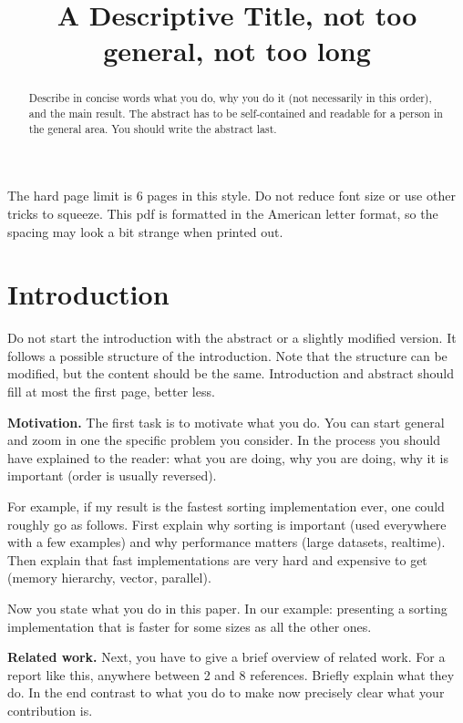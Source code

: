 \documentclass[letterpaper]{article}
\title{A Descriptive Title, not too general, not too long}
\newcommand{\mypar}[1]{{\bf #1.}}
\theoremstyle{definition}
\begin{document}
%
\maketitle
%

\clearpage
\iffalse

The hard page limit is 6 pages in this style. Do not reduce font size
or use other tricks to squeeze. This pdf is formatted in the American letter format, so the spacing may look a bit strange when printed out.

\begin{abstract}
Describe in concise words what you do, why you do it (not necessarily
in this order), and the main result.  The abstract has to be
self-contained and readable for a person in the general area. You
should write the abstract last.
\end{abstract}

\section{Introduction}\label{sec:intro}

Do not start the introduction with the abstract or a slightly modified
version. It follows a possible structure of the introduction. 
Note that the structure can be modified, but the
content should be the same. Introduction and abstract should fill at most the first page, better less.

\mypar{Motivation} The first task is to motivate what you do.  You can
start general and zoom in one the specific problem you consider.  In
the process you should have explained to the reader: what you are doing,
why you are doing, why it is important (order is usually reversed).

For example, if my result is the fastest sorting implementation ever, one
could roughly go as follows. First explain why sorting is important
(used everywhere with a few examples) and why performance matters (large datasets,
realtime). Then explain that fast implementations are very hard and
expensive to get (memory hierarchy, vector, parallel). 

Now you state what you do in this paper. In our example: 
presenting a sorting implementation that is
faster for some sizes as all the other ones.

\mypar{Related work} Next, you have to give a brief overview of
related work. For a report like this, anywhere between 2 and 8
references. Briefly explain what they do. In the end contrast to what
you do to make now precisely clear what your contribution is.
\end{document}
